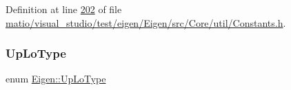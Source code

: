Definition at line \hyperlink{matio_2visual__studio_2test_2eigen_2_eigen_2src_2_core_2util_2_constants_8h_source_l00202}{202} of file \hyperlink{matio_2visual__studio_2test_2eigen_2_eigen_2src_2_core_2util_2_constants_8h_source}{matio/visual\+\_\+studio/test/eigen/\+Eigen/src/\+Core/util/\+Constants.\+h}.

\mbox{\label{group__enums_ga39e3366ff5554d731e7dc8bb642f83cd}} 
\subsubsection{\texorpdfstring{Up\+Lo\+Type}{UpLoType}\hspace{0.1cm}{\footnotesize\ttfamily [2/2]}}
{\footnotesize\ttfamily enum \hyperlink{group__enums_ga39e3366ff5554d731e7dc8bb642f83cd}{Eigen\+::\+Up\+Lo\+Type}}

